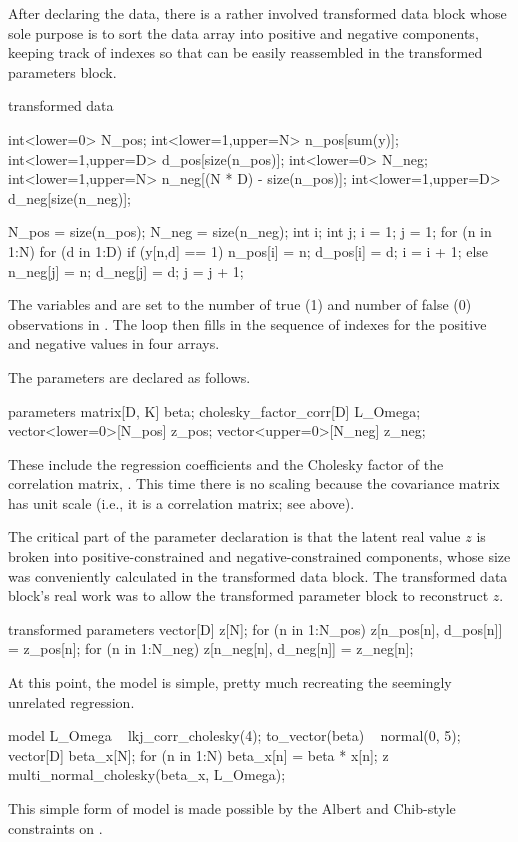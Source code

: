 After declaring the data, there is a rather involved transformed data
block whose sole purpose is to sort the data array  into
positive and negative components, keeping track of indexes so that
 can be easily reassembled in the transformed parameters
block.
%
\begin{stancode}
transformed data {
  int<lower=0> N_pos;
  int<lower=1,upper=N> n_pos[sum(y)];
  int<lower=1,upper=D> d_pos[size(n_pos)];
  int<lower=0> N_neg;
  int<lower=1,upper=N> n_neg[(N * D) - size(n_pos)];
  int<lower=1,upper=D> d_neg[size(n_neg)];

  N_pos = size(n_pos);
  N_neg = size(n_neg);
  {
    int i;
    int j;
    i = 1;
    j = 1;
    for (n in 1:N) {
      for (d in 1:D) {
        if (y[n,d] == 1) {
          n_pos[i] = n;
          d_pos[i] = d;
          i = i + 1;
        } else {
          n_neg[j] = n;
          d_neg[j] = d;
          j = j + 1;
        }
      }
    }
  }
}
\end{stancode}
%
The variables  and  are set to the number of
true (1) and number of false (0) observations in .  The loop
then fills in the sequence of indexes for the positive and negative
values in four arrays.

The parameters are declared as follows.
%
\begin{stancode}
parameters {
  matrix[D, K] beta;
  cholesky_factor_corr[D] L_Omega;
  vector<lower=0>[N_pos] z_pos;
  vector<upper=0>[N_neg] z_neg;
}
\end{stancode}
%
These include the regression coefficients  and the Cholesky
factor of the correlation matrix, .  This time there is
no scaling because the covariance matrix has unit scale (i.e., it is a
correlation matrix;  see above). 

The critical part of the parameter declaration is that the latent real
value $z$ is broken into positive-constrained and negative-constrained
components, whose size was conveniently calculated in the transformed
data block.  The transformed data block's real work was to allow the
transformed parameter block to reconstruct $z$.
%
\begin{stancode}
transformed parameters {
  vector[D] z[N];
  for (n in 1:N_pos)
    z[n_pos[n], d_pos[n]] = z_pos[n];
  for (n in 1:N_neg)
    z[n_neg[n], d_neg[n]] = z_neg[n];
}
\end{stancode}

At this point, the model is simple, pretty much recreating the
seemingly unrelated regression.
%
\begin{stancode}
model {
  L_Omega ~ lkj_corr_cholesky(4);
  to_vector(beta) ~ normal(0, 5);
  { 
    vector[D] beta_x[N];
    for (n in 1:N) 
      beta_x[n] = beta * x[n];
    z ~ multi_normal_cholesky(beta_x, L_Omega);
  }
}
\end{stancode}
%
This simple form of model is made possible by the Albert and
Chib-style constraints on .

